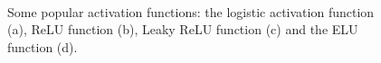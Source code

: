 \begin{figure} [H]
	\centering
	\\
	
	\caption{Some popular activation functions: the logistic activation function (a), ReLU function (b), Leaky ReLU function (c) and the ELU function (d). }%
	\label{fig:activation_functions}%
\end{figure}